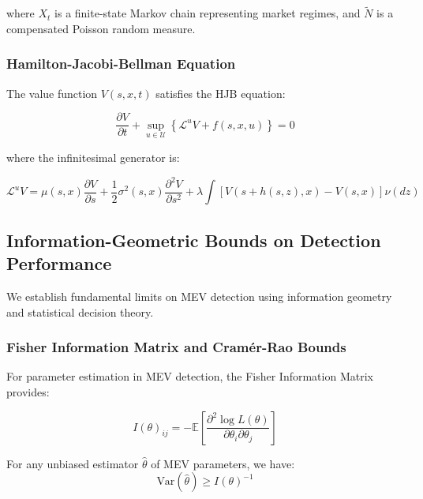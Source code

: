 \documentclass[12pt]{article}
\begin{document}
where $X_t$ is a finite-state Markov chain representing market regimes, and $\tilde{N}$ is a compensated Poisson random measure.

\subsubsection{Hamilton-Jacobi-Bellman Equation}

The value function $V(s,x,t)$ satisfies the HJB equation:

\begin{equation}
\frac{\partial V}{\partial t} + \sup_{u \in \mathcal{U}} \left\{\mathcal{L}^u V + f(s,x,u)\right\} = 0
\end{equation}

where the infinitesimal generator is:

\begin{equation}
\mathcal{L}^u V = \mu(s,x) \frac{\partial V}{\partial s} + \frac{1}{2}\sigma^2(s,x) \frac{\partial^2 V}{\partial s^2} + \lambda \int [V(s+h(s,z), x) - V(s,x)] \nu(dz)
\end{equation}

\subsection{Information-Geometric Bounds on Detection Performance}

We establish fundamental limits on MEV detection using information geometry and statistical decision theory.

\subsubsection{Fisher Information Matrix and Cramér-Rao Bounds}

For parameter estimation in MEV detection, the Fisher Information Matrix provides:

\begin{equation}
I(\theta)_{ij} = -\mathbb{E}\left[\frac{\partial^2 \log L(\theta)}{\partial \theta_i \partial \theta_j}\right]
\end{equation}

\begin{theorem}
For any unbiased estimator $\hat{\theta}$ of MEV parameters, we have:
\begin{equation}
\text{Var}(\hat{\theta}) \geq I(\theta)^{-1}
\end{equation}
\end{theorem}
\end{document}
